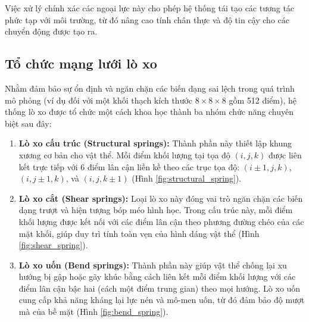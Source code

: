 \documentclass{report}
\begin{document}
Việc xử lý chính xác các ngoại lực này cho phép hệ thống tái tạo các tương tác phức tạp với môi trường, từ đó nâng cao tính chân thực và độ tin cậy cho các chuyển động được tạo ra.


\subsection{Tổ chức mạng lưới lò xo}
\label{sec:network}
Nhằm đảm bảo sự ổn định và ngăn chặn các biến dạng sai lệch trong quá trình mô phỏng (ví dụ đối với một khối thạch kích thước $8 \times 8 \times 8$ gồm 512 điểm), hệ thống lò xo được tổ chức một cách khoa học thành ba nhóm chức năng chuyên biệt sau đây:

\begin{enumerate}
    \item \textbf{Lò xo cấu trúc (Structural springs):} Thành phần này thiết lập khung xương cơ bản cho vật thể. Mỗi điểm khối lượng tại tọa độ $(i, j, k)$ được liên kết trực tiếp với 6 điểm lân cận liền kề theo các trục tọa độ: $(i\pm 1, j, k)$, $(i, j\pm 1, k)$, và $(i, j, k\pm 1)$ (Hình \ref{fig:structural_spring}).
    
    \item \textbf{Lò xo cắt (Shear springs):} Loại lò xo này đóng vai trò ngăn chặn các biến dạng trượt và hiện tượng bóp méo hình học. Trong cấu trúc này, mỗi điểm khối lượng được kết nối với các điểm lân cận theo phương đường chéo của các mặt khối, giúp duy trì tính toàn vẹn của hình dáng vật thể (Hình \ref{fig:shear_spring}).
    
    \item \textbf{Lò xo uốn (Bend springs):} Thành phần này giúp vật thể chống lại xu hướng bị gập hoặc gãy khúc bằng cách liên kết mỗi điểm khối lượng với các điểm lân cận bậc hai (cách một điểm trung gian) theo mọi hướng. Lò xo uốn cung cấp khả năng kháng lại lực nén và mô-men uốn, từ đó đảm bảo độ mượt mà của bề mặt (Hình \ref{fig:bend_spring}).
\end{enumerate}
\end{document}
